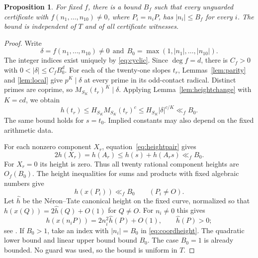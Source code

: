 \documentclass[11pt,reqno]{amsart}
\newtheorem{proposition}[theorem]{Proposition}
\theoremstyle{definition}
\numberwithin{equation}{section}
\def\t{\text}
\begin{document}
\begin{proposition}\label{prop:height}
For fixed $f$, there is a bound $B_f$ such that every unguarded certificate with $f(n_1,\ldots,n_{10})\ne0$, where $P_i=n_iP$, has $|n_i|\le B_f$ for every $i$. The bound is independent of $T$ and of all certificate witnesses.
\end{proposition}
\begin{proof}
Write
\[
 \delta=f(n_1,\ldots,n_{10})\ne0\ \ \t{and}\ \ B_0=\max(1,|n_1|,\ldots,|n_{10}|).
\]
The integer indices exist uniquely by \eqref{eq:cyclic}. Since $\deg f=d$, there is $C_f>0$ with
$ 0<|\delta|\le C_fB_0^d.$
For each of the twenty-one slopes $t_r$, Lemmas~\ref{lem:parity} and \ref{lem:local} give $p^K\mid\delta$ at every prime in its odd-contact radical. Distinct primes are coprime, so
$ M_{S_K}(t_r)^K\mid\delta.$
Applying Lemma~\ref{lem:heightchange} with $K=cd$, we obtain
\begin{equation}\label{eq:directheight}
 h(t_r)\le H_{S_K}M_{S_K}(t_r)^c
 \le H_{S_K}|\delta|^{c/K}\ll_f B_0.
\end{equation}
The same bound holds for $s=t_0$. Implied constants may also depend on the fixed arithmetic data.

For each nonzero component $X_r$, equation~\eqref{eq:heightpair} gives
\[
 2h(X_r)=h(A_r)\le h(s)+h(A_rs)\ll_f B_0.
\]
For $X_r=0$ its height is zero. Thus all twenty rational component heights are $O_f(B_0)$. The height inequalities for sums and products with fixed algebraic numbers give
\begin{equation}\label{eq:coordheight}
 h(x(P_i))\ll_f B_0\qquad(P_i\ne O).
\end{equation}
Let $\widehat h$ be the N\'eron--Tate canonical height on the fixed curve, normalized so that $h(x(Q))=2\widehat h(Q)+O(1)$ for $Q\ne O$. For $n_i\ne0$ this gives
\[
 h(x(n_iP))=2n_i^2\widehat h(P)+O(1),\qquad \widehat h(P)>0;
\]
see \cite[Chapter VIII]{Silv}. If $B_0>1$, take an index with $|n_i|=B_0$ in \eqref{eq:coordheight}. The quadratic lower bound and linear upper bound bound $B_0$. The case $B_0=1$ is already bounded. No guard was used, so the bound is uniform in $T$.
\end{proof}
\end{document}
